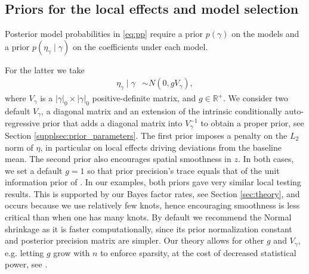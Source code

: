 \subsection{Priors for the local effects and model selection}
\label{ssec:priors}


Posterior model probabilities in \eqref{eq:pp} require a prior $p(\gamma)$ on the models and a prior $p(\eta_\gamma \mid \gamma)$ on the coefficients under each model.
 
For the latter we take 
\begin{align}
 \eta_\gamma \mid \gamma &\sim N(0, g V_\gamma),
\label{eq:prior_paramters}
\end{align}
where $V_\gamma$ is a $|\gamma|_0 \times |\gamma|_0$ positive-definite matrix, and $g \in \mathbb{R}^+$.
We consider two default $V_\gamma$, a diagonal matrix and an extension of the intrinsic conditionally auto-regressive prior \citep{besag:1974} that adds a diagonal matrix into $V_\gamma^{-1}$ to obtain a proper prior, see Section \ref{supplsec:prior_parameters}. The first prior imposes a penalty on the $L_2$ norm of $\eta$, in particular on local effects driving deviations from the baseline mean. The second prior also encourages spatial smoothness in $z$.
In both cases, 
we set a default $g=1$ so that prior precision's trace equals that of the unit information prior of \cite{schwarz:1978}.
In our examples, both priors gave very similar local testing results. This is supported by our Bayes factor rates, see Section \ref{sec:theory}, and occurs because we use relatively few knots, hence encouraging smoothness is less critical than when one has many knots. By default we recommend the Normal shrinkage as it is faster computationally, since its prior normalization constant and posterior precision matrix are simpler.
Our theory allows for other $g$ and $V_\gamma$, e.g. letting $g$ grow with $n$ to enforce sparsity, at the cost of decreased statistical power, see \cite{narisetty:2014,rossell:2022}.

